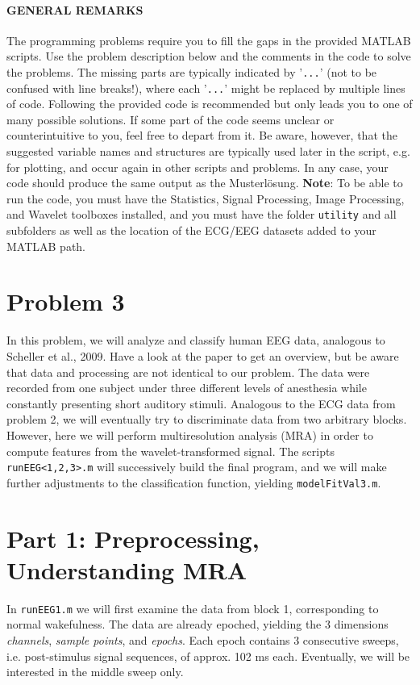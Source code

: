 \documentclass[10pt,a4paper,notitlepage]{report}
\begin{document}
\paragraph*{GENERAL REMARKS} The programming problems require you to fill the gaps in the provided MATLAB scripts. Use the problem description below and the comments in the code to solve the problems. The missing parts are typically indicated by '\texttt{...}' (not to be confused with line breaks!), where each '\texttt{...}' might be replaced by multiple lines of code. Following the provided code is recommended but only leads you to one of many possible solutions. If some part of the code seems unclear or counterintuitive to you, feel free to depart from it. Be aware, however, that the suggested variable names and structures are typically used later in the script, e.g. for plotting, and occur again in other scripts and problems. In any case, your code should produce the same output as the Musterlösung. \textbf{Note}: To be able to run the code, you must have the Statistics, Signal Processing, Image Processing, and Wavelet toolboxes installed, and you must have the folder \texttt{utility} and all subfolders as well as the location of the ECG/EEG datasets added to your MATLAB path.

\section*{Problem 3}
In this problem, we will analyze and classify human EEG data, analogous to Scheller et al., 2009. Have a look at the paper to get an overview, but be aware that data and processing are not identical to our problem. The data were recorded from one subject under three different levels of anesthesia while constantly presenting short auditory stimuli. Analogous to the ECG data from problem 2, we will eventually try to discriminate data from two arbitrary blocks. However, here we will perform multiresolution analysis (MRA) in order to compute features from the wavelet-transformed signal. The scripts \texttt{runEEG<1,2,3>.m} will successively build the final program, and we will make further adjustments to the classification function, yielding \texttt{modelFitVal3.m}.

\section*{Part 1: Preprocessing, Understanding MRA}
In \texttt{runEEG1.m} we will first examine the data from block 1, corresponding to normal wakefulness. The data are already epoched, yielding the 3 dimensions \textit{channels}, \textit{sample points}, and \textit{epochs}. Each epoch contains 3 consecutive sweeps, i.e. post-stimulus signal sequences, of approx. 102 ms each. Eventually, we will be interested in the middle sweep only.
\end{document}
